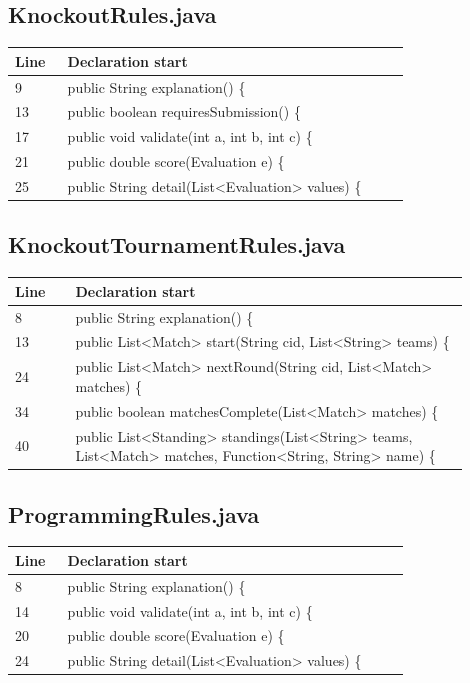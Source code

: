 \subsection*{KnockoutRules.java}
\begin{longtable}{p{0.12\linewidth}p{0.78\linewidth}}\toprule Line & Declaration start\\\midrule\endhead
9 & public String explanation() \{\\
13 & public boolean requiresSubmission() \{\\
17 & public void validate(int a, int b, int c) \{\\
21 & public double score(Evaluation e) \{\\
25 & public String detail(List<Evaluation> values) \{\\
\bottomrule\end{longtable}
\subsection*{KnockoutTournamentRules.java}
\begin{longtable}{p{0.12\linewidth}p{0.78\linewidth}}\toprule Line & Declaration start\\\midrule\endhead
8 & public String explanation() \{\\
13 & public List<Match> start(String cid, List<String> teams) \{\\
24 & public List<Match> nextRound(String cid, List<Match> matches) \{\\
34 & public boolean matchesComplete(List<Match> matches) \{\\
40 & public List<Standing> standings(List<String> teams, List<Match> matches, Function<String, String> name) \{\\
\bottomrule\end{longtable}
\subsection*{ProgrammingRules.java}
\begin{longtable}{p{0.12\linewidth}p{0.78\linewidth}}\toprule Line & Declaration start\\\midrule\endhead
8 & public String explanation() \{\\
14 & public void validate(int a, int b, int c) \{\\
20 & public double score(Evaluation e) \{\\
24 & public String detail(List<Evaluation> values) \{\\
\bottomrule\end{longtable}
